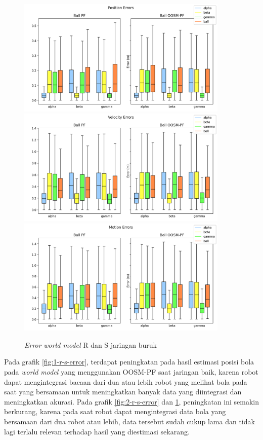 \begin{figure}[p]
    \centering
    \medskip
    \includegraphics[width=0.9\textwidth]{resources/cfg3_AR_AS_error_pos.png}
    \includegraphics[width=0.9\textwidth]{resources/cfg3_AR_AS_error_vel.png}
    \includegraphics[width=0.9\textwidth]{resources/cfg3_AR_AS_error_motion.png}
    \caption{\textit{Error} \textit{world model} R dan S jaringan buruk}
    \label{fig:3-r-s-error}
    \bigskip
\end{figure}

Pada grafik \ref{fig:1-r-s-error}, terdapat peningkatan pada hasil estimasi posisi bola pada \textit{world model} yang menggunakan OOSM-PF saat jaringan baik, karena robot dapat mengintegrasi bacaan dari dua atau lebih robot yang melihat bola pada saat yang bersamaan untuk meningkatkan banyak data yang diintegrasi dan meningkatkan akurasi. Pada grafik \ref{fig:2-r-s-error} dan \ref{fig:3-r-s-error}, peningkatan ini semakin berkurang, karena pada saat robot dapat mengintegrasi data bola yang bersamaan dari dua robot atau lebih, data tersebut sudah cukup lama dan tidak lagi terlalu relevan terhadap hasil yang diestimasi sekarang.


